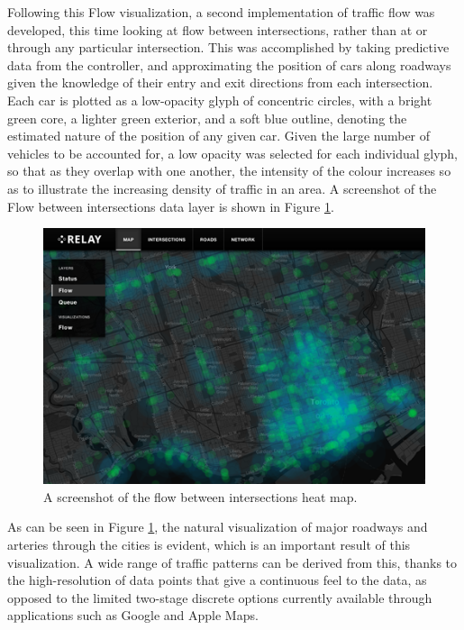 \documentclass{report}
\begin{document}
Following this Flow visualization, a second implementation of traffic flow was developed, this time looking at flow between intersections, rather than at or through any particular intersection.
This was accomplished by taking predictive data from the controller, and approximating the position of cars along roadways given the knowledge of their entry and exit directions from each intersection.
Each car is plotted as a low-opacity glyph of concentric circles, with a bright green core, a lighter green exterior, and a soft blue outline, denoting the estimated nature of the position of any given car.
Given the large number of vehicles to be accounted for, a low opacity was selected for each individual glyph, so that as they overlap with one another, the intensity of the colour increases so as to illustrate the increasing density of traffic in an area.
A screenshot of the Flow between intersections data layer is shown in Figure \ref{fig:flow-2}.

\begin{figure}[htbp!]
  \begin{centering}
    \includegraphics[scale=0.9]{figures/flow-2.png}
    \caption{A screenshot of the flow between intersections heat map.}
    \label{fig:flow-2}
  \end{centering}
\end{figure}

As can be seen in Figure \ref{fig:flow-2}, the natural visualization of major roadways and arteries through the cities is evident, which is an important result of this visualization.
A wide range of traffic patterns can be derived from this, thanks to the high-resolution of data points that give a continuous feel to the data, as opposed to the limited two-stage discrete options currently available through applications such as Google and Apple Maps.
\end{document}
